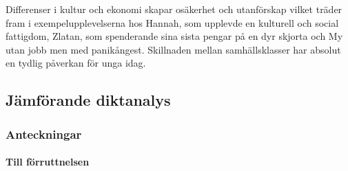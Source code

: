 Differenser i kultur och ekonomi skapar osäkerhet och utanförskap vilket träder fram i exempelupplevelserna hos Hannah, som upplevde en kulturell och social fattigdom, Zlatan, som spenderande sina sista pengar på en dyr skjorta och My utan jobb men med panikångest. Skillnaden mellan samhällsklasser har absolut en tydlig påverkan för unga idag.

\newpage
\subsection{Jämförande diktanalys}

\subsubsection{Anteckningar}

\paragraph{Till förruttnelsen}







